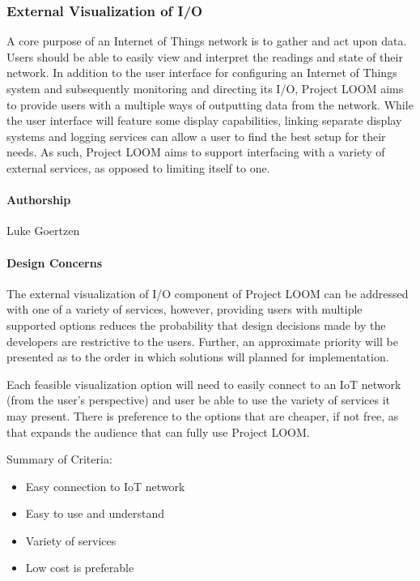 \documentclass[onecolumn, draftclsnofoot,10pt, compsoc]{IEEEtran}
\begin{document}
\subsubsection{External Visualization of I/O}
    A core purpose of an Internet of Things network is to gather and act upon data. Users should be able to easily view and interpret the readings and state of their network. In addition to the user interface for configuring an Internet of Things system and subsequently monitoring and directing its I/O, Project LOOM aims to provide users with a multiple ways of outputting data from the network. While the user interface will feature some display capabilities, linking separate display systems and logging services can allow a user to find the best setup for their needs. As such, Project LOOM aims to support interfacing with a variety of external services, as opposed to limiting itself to one.

\paragraph{Authorship}
    Luke Goertzen

\paragraph{Design Concerns}
    The external visualization of I/O component of Project LOOM can be addressed with one of a variety of services, however, providing users with multiple supported options reduces the probability that design decisions made by the developers are restrictive to the users. Further, an approximate priority will be presented as to the order in which solutions will planned for implementation.

    Each feasible visualization option will need to easily connect to an IoT network (from the user's perspective) and user be able to use the variety of services it may present. There is preference to the options that are cheaper, if not free, as that expands the audience that can fully use Project LOOM.

    Summary of Criteria:
    \begin{itemize}[noitemsep,topsep=-10pt]
        \item Easy connection to IoT network
        \item Easy to use and understand
        \item Variety of services
        \item Low cost is preferable
    \end{itemize}
\end{document}
